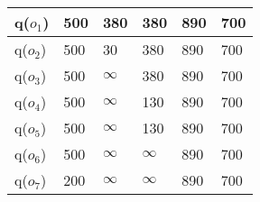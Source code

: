 \documentclass[12pt, a4paper]{article}
\begin{document}
\begin{enumerate}[label=(\alph*)]
\begin{table}[H]
\begin{tabular}{l|lllll}
    q($o_{1}$)                    & \multicolumn{1}{l|}{500} & \multicolumn{1}{l|}{\cellcolor[HTML]{34FF34}380} & \multicolumn{1}{l|}{380} & \multicolumn{1}{l|}{890} & 700\\ \hline
    q($o_{2}$)                    & \multicolumn{1}{l|}{500} & \multicolumn{1}{l|}{\cellcolor[HTML]{34FF34}30} & \multicolumn{1}{l|}{380} & \multicolumn{1}{l|}{890} & 700\\ \hline
    q($o_{3}$)                    & \multicolumn{1}{l|}{500} & \multicolumn{1}{l|}{$\infty$} & \multicolumn{1}{l|}{\cellcolor[HTML]{34FF34}380} & \multicolumn{1}{l|}{890} & 700\\ \hline
    q($o_{4}$)                    & \multicolumn{1}{l|}{500} & \multicolumn{1}{l|}{$\infty$} & \multicolumn{1}{l|}{\cellcolor[HTML]{34FF34}130} & \multicolumn{1}{l|}{890} & 700\\ \hline
    q($o_{5}$)                    & \multicolumn{1}{l|}{500} & \multicolumn{1}{l|}{$\infty$} & \multicolumn{1}{l|}{\cellcolor[HTML]{34FF34}130} & \multicolumn{1}{l|}{890} & 700\\ \hline
    q($o_{6}$)                    & \multicolumn{1}{l|}{\cellcolor[HTML]{34FF34}500} & \multicolumn{1}{l|}{$\infty$} & \multicolumn{1}{l|}{$\infty$} & \multicolumn{1}{l|}{890} & 700\\ \hline
    q($o_{7}$)                    & \multicolumn{1}{l|}{\cellcolor[HTML]{34FF34}200} & \multicolumn{1}{l|}{$\infty$} & \multicolumn{1}{l|}{$\infty$} & \multicolumn{1}{l|}{890} & 700\\ \hline
    \end{tabular}
    \end{table}

\end{enumerate}
\end{document}
